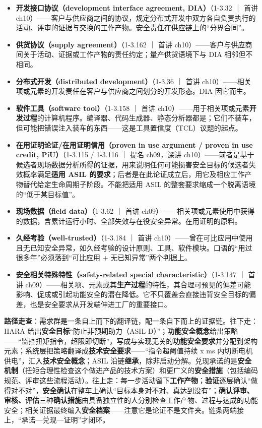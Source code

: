 \begin{itemize}
\item \textbf{开发接口协议（development interface agreement, DIA）}（1-3.32 ｜ 首讲 ch10）——客户与供应商之间的协议，规定分布式开发中双方各自负责执行的活动、评审的证据与交换的工作产物。安全责任在供应链上的“分界合同”。
\item \textbf{供货协议（supply agreement）}（1-3.162 ｜ 首讲 ch10）——客户与供应商间关于活动、证据或工作产物的责任约定；量产供货语境下与 DIA 相邻但不相同。
\item \textbf{分布式开发（distributed development）}（1-3.36 ｜ 首讲 ch10）——相关项或元素的开发责任在客户与供应商之间划分的开发形态。DIA 因它而生。
\item \textbf{软件工具（software tool）}（1-3.158 ｜ 首讲 ch10）——用于相关项或元素\textbf{开发过程}的计算机程序。编译器、代码生成器、静态分析器都是；它们不装车，但可能把错误注入装车的东西——这是工具置信度（TCL）议题的起点。
\item \textbf{在用证明论证/在用证明信用（proven in use argument / proven in use credit, PiU）}（1-3.115 / 1-3.116 ｜ 提名 ch09，深讲 ch10）——前者是基于候选者现场数据分析所得的证据，用来说明任何可能损害安全目标的候选者失效概率满足\textbf{适用 ASIL 的要求}；后者是在此论证成立后，用它及相应工作产物替代给定生命周期子阶段。不能把适用 ASIL 的整套要求缩成一个脱离语境的“低于某目标值”。
\item \textbf{现场数据（field data）}（1-3.62 ｜ 首讲 ch09）——相关项或元素使用中获得的数据，含累计运行小时、全部失效与在役安全异常。在用证明的原料。
\item \textbf{久经考验（well-trusted）}（1-3.184 ｜ 首讲 ch10）——曾在可比应用中使用且无已知安全异常，如久经考验的设计原则、工具、软件模块。口语的“用过很多年”必须落到“可比应用 + 无已知异常”两个判据上。
\item \textbf{安全相关特殊特性（safety-related special characteristic）}（1-3.147 ｜ 首讲 ch09）——相关项、元素或其\textbf{生产过程}的特性，其合理可预见的偏差可能影响、促成或引起功能安全的潜在降低。它不只覆盖会直接违背安全目标的偏差，也是安全要求从开发端伸进工厂的重要接口。
\end{itemize}

\textbf{路径走查}：需求群是一条自上而下的翻译链，配一条自下而上的证据链。往下走：HARA 给出\textbf{安全目标}“防止非预期助力（ASIL D）”；\textbf{功能安全概念}给出策略——“监控扭矩指令，超限即切断”，写成与实现无关的\textbf{功能安全要求}并分配到架构元素；系统层把策略翻译成\textbf{技术安全要求}——“指令超阈值持续 x ms 内切断电机供电”，汇入\textbf{技术安全概念}；ASIL 沿链\textbf{继承}，除非启动分解。兑现承诺的是\textbf{安全机制}（扭矩合理性检查这个做进产品的技术方案）和更广义的\textbf{安全措施}（包括编码规范、评审这些流程活动）。往上走：每一步活动留下\textbf{工作产物}；\textbf{验证}逐层确认“做得对不对”，\textbf{安全确认}在整车上确认“目标本身对不对、真达到没有”；\textbf{确认评审、审核、评估}三种\textbf{确认措施}由具备独立性的人分别检查工作产物、过程与达成的功能安全；相关证据最终编入\textbf{安全档案}——注意它是论证不是文件夹。链条两端接上，“承诺—兑现—证明”才闭环。


